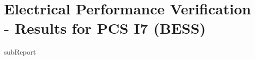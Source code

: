 \renewcommand{\DTRPcs}{I7PPM} %
\renewcommand{\DTRPcsLong}{I7 (BESS)}


    \section{Electrical Performance Verification - Results for PCS \DTRPcsLong}

    {{subReport}}
    \newpage

